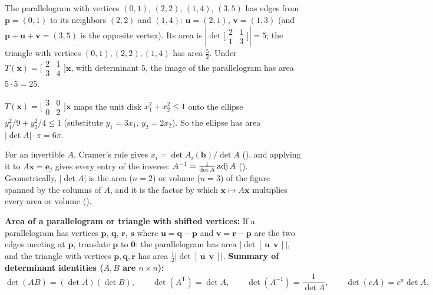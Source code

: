 \documentclass[10pt]{scrartcl}
\newcommand{\vv}[1]{\mathbf{#1}}
\begin{document}
\begin{example*}
The parallelogram with vertices $(0,1)$, $(2,2)$, $(1,4)$, $(3,5)$ has edges from $\vv p=(0,1)$ to its neighbors $(2,2)$ and $(1,4)$: $\vv u=(2,1)$, $\vv v=(1,3)$ (and $\vv p+\vv u+\vv v=(3,5)$ is the opposite vertex). Its area is $|\det\bigl[\begin{smallmatrix}2&1\\1&3\end{smallmatrix}\bigr]|=5$; the triangle with vertices $(0,1),(2,2),(1,4)$ has area $\tfrac52$. Under $T(\vv x)=\bigl[\begin{smallmatrix}2&1\\3&4\end{smallmatrix}\bigr]\vv x$, with determinant $5$, the image of the parallelogram has area $5\cdot5=25$.
\end{example*}

\begin{example*}
$T(\vv x)=\bigl[\begin{smallmatrix}3&0\\0&2\end{smallmatrix}\bigr]\vv x$ maps the unit disk $x_1^2+x_2^2\le1$ onto the ellipse $y_1^2/9+y_2^2/4\le1$ (substitute $y_1=3x_1$, $y_2=2x_2$). So the ellipse has area $|\det A|\cdot\pi=6\pi$.
\end{example*}

\revisit
For an invertible $A$, Cramer's rule gives $x_i=\det A_i(\vv b)/\det A$ (), and applying it to $A\vv x=\vv e_j$ gives every entry of the inverse: $A^{-1}=\frac{1}{\det A}\operatorname{adj} A$ (). Geometrically, $|\det A|$ is the area ($n=2$) or volume ($n=3$) of the figure spanned by the columns of $A$, and it is the factor by which $\vv x\mapsto A\vv x$ multiplies every area or volume ().

\begin{shortcuts}
  \ii \textbf{Area of a parallelogram or triangle with shifted vertices:} If a parallelogram has vertices $\vv p$, $\vv q$, $\vv r$, $\vv s$ where $\vv u=\vv q-\vv p$ and $\vv v=\vv r-\vv p$ are the two edges meeting at $\vv p$, translate $\vv p$ to $\vv 0$: the parallelogram has area $|\det[\,\vv u\ \ \vv v\,]|$, and the triangle with vertices $\vv p,\vv q,\vv r$ has area $\frac{1}{2}|\det[\,\vv u\ \ \vv v\,]|$.
  \ii \textbf{Summary of determinant identities ($A,B$ are $n\times n$):}
  \[
    \det(AB)=(\det A)(\det B), \qquad \det(A^{\mathsf T})=\det A, \qquad \det(A^{-1})=\frac{1}{\det A}, \qquad \det(cA)=c^n\det A.
  \]
\end{shortcuts}
\end{document}
